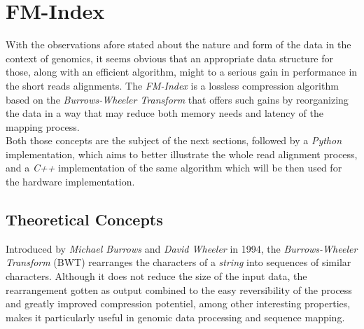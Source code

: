 
\chapter{FM-Index} %

\label{Chapter2} %



With the observations afore stated about the nature and form of the data in the context of genomics, it seems obvious that an appropriate data structure for those, along with an efficient algorithm, might to a serious gain in performance in the short reads alignments. The \textsl{FM-Index} is a lossless compression algorithm based on the \textsl{Burrows-Wheeler Transform} that offers such gains by reorganizing the data in a way that may reduce both memory needs and latency of the mapping process. \\

Both those concepts are the subject of the next sections, followed by a \textsl{Python} implementation, which aims to better illustrate the whole read alignment process, and a \textsl{C++} implementation of the same algorithm which will be then used for the hardware implementation.

\section{Theoretical Concepts}

Introduced by \textsl{Michael Burrows} and \textsl{David Wheeler} in 1994, the \textsl{Burrows-Wheeler Transform} (BWT) rearranges the characters of a \textit{string} into sequences of similar characters. Although it does not reduce the size of the input data, the rearrangement gotten as output combined to the easy reversibility of the process and greatly improved compression potentiel, among other interesting properties, makes it particularly useful in genomic data processing and sequence mapping. 

